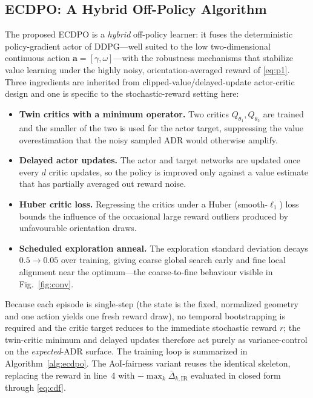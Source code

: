 \documentclass[conference]{IEEEtran}
\begin{document}
\subsection{ECDPO: A Hybrid Off-Policy Algorithm}
\label{sec:ecdpo}
The proposed ECDPO is a \emph{hybrid} off-policy learner: it fuses the
deterministic policy-gradient actor of DDPG---well suited to the low
two-dimensional continuous action $\mathbf a=[\gamma,\omega]$---with the
robustness mechanisms that stabilize value learning under the highly noisy,
orientation-averaged reward of \eqref{eq:p1}. Three ingredients are inherited
from clipped-value/delayed-update actor-critic design and one is specific to
the stochastic-reward setting here:
\begin{itemize}
\item \textbf{Twin critics with a minimum operator.} Two critics
$Q_{\theta_1},Q_{\theta_2}$ are trained and the smaller of the two is used
for the actor target, suppressing the value overestimation that the noisy
sampled ADR would otherwise amplify.
\item \textbf{Delayed actor updates.} The actor and target networks are
updated once every $d$ critic updates, so the policy is improved only against
a value estimate that has partially averaged out reward noise.
\item \textbf{Huber critic loss.} Regressing the critics under a Huber
(smooth-$\ell_1$) loss bounds the influence of the occasional large reward
outliers produced by unfavourable orientation draws.
\item \textbf{Scheduled exploration anneal.} The exploration standard
deviation decays $0.5\!\to\!0.05$ over training, giving coarse global search
early and fine local alignment near the optimum---the coarse-to-fine
behaviour visible in Fig.~\ref{fig:conv}.
\end{itemize}
Because each episode is single-step (the state is the fixed, normalized
geometry and one action yields one fresh reward draw), no temporal
bootstrapping is required and the critic target reduces to the immediate
stochastic reward $r$; the twin-critic minimum and delayed updates therefore
act purely as variance-control on the \emph{expected}-ADR surface. The
training loop is summarized in Algorithm~\ref{alg:ecdpo}. The AoI-fairness
variant reuses the identical skeleton, replacing the reward in line~4 with
$-\max_k \bar{\Delta}_{k,\mathrm{IR}}$ evaluated in closed form through
\eqref{eq:cdf}.
\end{document}
